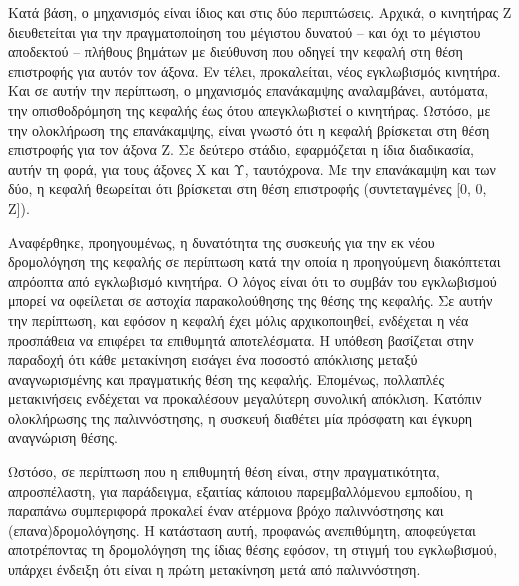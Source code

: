 Κατά βάση, ο μηχανισμός είναι ίδιος και στις δύο περιπτώσεις. Αρχικά, ο
κινητήρας Z διευθετείται για την πραγματοποίηση του μέγιστου δυνατού -- και όχι
το μέγιστου αποδεκτού -- πλήθους βημάτων με διεύθυνση που οδηγεί την κεφαλή στη
θέση επιστροφής για αυτόν τον άξονα. Εν τέλει, προκαλείται, νέος εγκλωβισμός
κινητήρα. Και σε αυτήν την περίπτωση, ο μηχανισμός επανάκαμψης αναλαμβάνει,
αυτόματα, την οπισθοδρόμηση της κεφαλής έως ότου απεγκλωβιστεί ο κινητήρας.
Ωστόσο, με την ολοκλήρωση της επανάκαμψης, είναι γνωστό ότι η κεφαλή βρίσκεται
στη θέση επιστροφής για τον άξονα Z. Σε δεύτερο στάδιο, εφαρμόζεται η ίδια
διαδικασία, αυτήν τη φορά, για τους άξονες X και Υ, ταυτόχρονα. Με την
επανάκαμψη και των δύο, η κεφαλή θεωρείται ότι βρίσκεται στη θέση επιστροφής
(συντεταγμένες [0, 0, Z]).

Αναφέρθηκε, προηγουμένως, η δυνατότητα της συσκευής για την εκ νέου δρομολόγηση
της κεφαλής σε περίπτωση κατά την οποία η προηγούμενη διακόπτεται απρόοπτα από
εγκλωβισμό κινητήρα. Ο λόγος είναι ότι το συμβάν του εγκλωβισμού μπορεί να
οφείλεται σε αστοχία παρακολούθησης της θέσης της κεφαλής. Σε αυτήν την
περίπτωση, και εφόσον η κεφαλή έχει μόλις αρχικοποιηθεί, ενδέχεται η νέα
προσπάθεια να επιφέρει τα επιθυμητά αποτελέσματα. Η υπόθεση βασίζεται στην
παραδοχή ότι κάθε μετακίνηση εισάγει ένα ποσοστό απόκλισης μεταξύ αναγνωρισμένης
και πραγματικής θέση της κεφαλής. Επομένως, πολλαπλές μετακινήσεις ενδέχεται
να προκαλέσουν μεγαλύτερη συνολική απόκλιση. Κατόπιν ολοκλήρωσης της
παλιννόστησης, η συσκευή διαθέτει μία πρόσφατη και έγκυρη αναγνώριση θέσης.

Ωστόσο, σε περίπτωση που η επιθυμητή θέση είναι, στην πραγματικότητα,
απροσπέλαστη, για παράδειγμα, εξαιτίας κάποιου παρεμβαλλόμενου εμποδίου, η
παραπάνω συμπεριφορά προκαλεί έναν ατέρμονα βρόχο παλιννόστησης και
(επανα)δρομολόγησης. Η κατάσταση αυτή, προφανώς ανεπιθύμητη, αποφεύγεται
αποτρέποντας τη δρομολόγηση της ίδιας θέσης εφόσον, τη στιγμή του εγκλωβισμού,
υπάρχει ένδειξη ότι είναι η πρώτη μετακίνηση μετά από παλιννόστηση.










